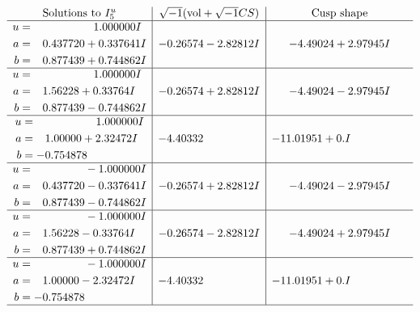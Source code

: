 \documentclass[1p]{elsarticle_modified}
\theoremstyle{definition}
\newcommand{\I}{\sqrt{-1}}
\begin{document}
$$\begin{array}{c|c|c}  
\text{Solutions to }I^u_{5}& \I (\text{vol} + \sqrt{-1}CS) & \text{Cusp shape}\\
 \hline 
\begin{aligned}
u &= \phantom{-0.000000 -}1.000000 I \\
a &= \phantom{-}0.437720 + 0.337641 I \\
b &= \phantom{-}0.877439 + 0.744862 I\end{aligned}
 & -0.26574 - 2.82812 I & -4.49024 + 2.97945 I \\ \hline\begin{aligned}
u &= \phantom{-0.000000 -}1.000000 I \\
a &= \phantom{-}1.56228 + 0.33764 I \\
b &= \phantom{-}0.877439 - 0.744862 I\end{aligned}
 & -0.26574 + 2.82812 I & -4.49024 - 2.97945 I \\ \hline\begin{aligned}
u &= \phantom{-0.000000 -}1.000000 I \\
a &= \phantom{-}1.00000 + 2.32472 I \\
b &= -0.754878\phantom{ +0.000000I}\end{aligned}
 & -4.40332\phantom{ +0.000000I} & -11.01951 + 0. I\phantom{ +0.000000I} \\ \hline\begin{aligned}
u &= \phantom{-0.000000 } -1.000000 I \\
a &= \phantom{-}0.437720 - 0.337641 I \\
b &= \phantom{-}0.877439 - 0.744862 I\end{aligned}
 & -0.26574 + 2.82812 I & -4.49024 - 2.97945 I \\ \hline\begin{aligned}
u &= \phantom{-0.000000 } -1.000000 I \\
a &= \phantom{-}1.56228 - 0.33764 I \\
b &= \phantom{-}0.877439 + 0.744862 I\end{aligned}
 & -0.26574 - 2.82812 I & -4.49024 + 2.97945 I \\ \hline\begin{aligned}
u &= \phantom{-0.000000 } -1.000000 I \\
a &= \phantom{-}1.00000 - 2.32472 I \\
b &= -0.754878\phantom{ +0.000000I}\end{aligned}
 & -4.40332\phantom{ +0.000000I} & -11.01951 + 0. I\phantom{ +0.000000I}\\
 \hline 
 \end{array}$$\newpage
\end{document}
